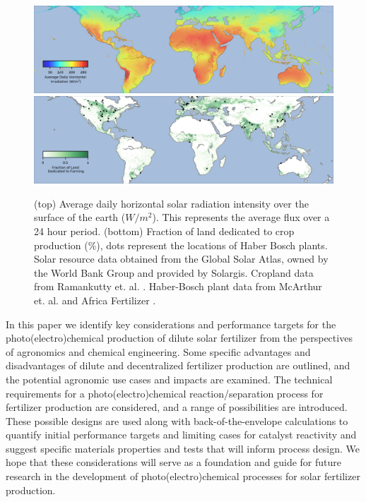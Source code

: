 \begin{figure}
    \centering
    \includegraphics[width=1\textwidth]{Figures/solar_map.png}
    \includegraphics[width=1\textwidth]{Figures/croplands_map.png}
    \caption{(top) Average daily horizontal solar radiation intensity over the surface of the earth ($W/m^2$). This represents the average flux over a 24 hour period. (bottom) Fraction of land dedicated to crop production (\%), dots represent the locations of Haber Bosch plants. Solar resource data obtained from the Global Solar Atlas, owned by the World Bank Group and provided by Solargis. Cropland data from Ramankutty et. al. \cite{Ramankutty_2008, Ramankutty2010}. Haber-Bosch plant data from McArthur et. al.\cite{McArthur_2017} and Africa Fertilizer \cite{africafertilizer_2018}.} 
    
    
    \label{fig:usemap}
\end{figure}

In this paper we identify key considerations and performance targets for the photo(electro)chemical production of dilute solar fertilizer from the perspectives of agronomics and chemical engineering. Some specific advantages and disadvantages of dilute and decentralized fertilizer production are outlined, and the potential agronomic use cases and impacts are examined. The technical requirements for a photo(electro)chemical reaction/separation process for fertilizer production are considered, and a range of possibilities are introduced. These possible designs are used along with back-of-the-envelope calculations to quantify initial performance targets and limiting cases for catalyst reactivity and suggest specific materials properties and tests that will inform process design. We hope that these considerations will serve as a foundation and guide for future research in the development of photo(electro)chemical processes for solar fertilizer production.

